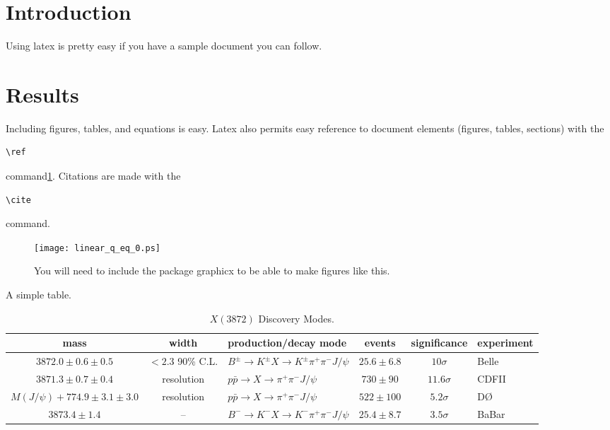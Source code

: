 \documentclass[aps,floatfix,prd,showpacs]{revtex4}
\begin{document}

\date{\today}

\begin{abstract}
An abstract is a great convenience for the reader and is required by all journals.
\end{abstract}
\maketitle

\section{Introduction}

Using latex is pretty easy if you have a sample document you can follow.

\section{Results}
Including figures, tables, and equations is easy. Latex also permits easy reference to document elements (figures, tables, sections) with the \begin{verbatim}\ref\end{verbatim} command\ref{fig1}. Citations are made with the \begin{verbatim}\cite\end{verbatim} command\cite{lamport}. 

\begin{figure}[ht]
\texttt{[image: linear\_q\_eq\_0.ps]}
\caption{You will need to include the package graphicx to be able to make figures like this.}
\label{fig1}
\end{figure}

A simple table.

\begin{table}[ht]
\caption{$X(3872)$ Discovery Modes.}
\label{XmodesTab}
\begin{tabular}{cclccl}
\hline
mass & width & production/decay mode & events & significance & experiment\\
\hline
\hline
$3872.0 \pm 0.6 \pm 0.5$  & $< 2.3$ 90\% C.L.  & $B^\pm \to K^\pm X \to K^\pm \pi^+ \pi^- J/\psi$   &  $25.6 \pm 6.8$ & $10 \sigma$     & Belle\\
$3871.3 \pm 0.7 \pm 0.4$  & resolution & $p\bar p \to  X \to \pi^+ \pi^- J/\psi$   &  $730 \pm 90$ & $11.6 \sigma$  & CDFII\\
$M(J/\psi) + 774.9 \pm 3.1 \pm 3.0$ & resolution & $p\bar p \to X \to \pi^+\pi^-J/\psi$ & $522 \pm 100$ & $5.2 \sigma$  & D{\O} \\
$3873.4 \pm 1.4$  &  --  & $B^- \to K^- X \to K^- \pi^+ \pi^- J/\psi$   &  $25.4 \pm 8.7$ &$3.5 \sigma$ & BaBar\\
\hline
\hline
\end{tabular}
\end{table}
\end{document}
